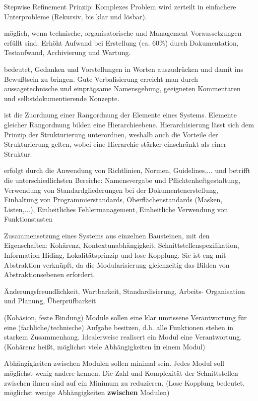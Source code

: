 \documentclass[a4paper,fontsize=9pt, DIV=calc]{scrartcl}
\begin{document}
\begin{multicols}{2}
\begin{description}[leftmargin=*]
		\item[Dekomposition] Stepwise Refinement Prinzip: Komplexes Problem wird zerteilt in einfachere Unterprobleme (Rekursiv, bis klar und lösbar).
		
		\item[Wiederverwendung] möglich, wenn technische, organisatorische und Management Voraussetzungen erfüllt sind. Erhöht Aufwand bei Erstellung (ca. 60\%) durch Dokumentation, Testaufwand, Archivierung und Wartung.
		 \item[Verbalisierung] bedeutet, Gedanken und Vorstellungen in Worten auszudrücken und damit ins Bewußtsein zu bringen. Gute Verbalisierung erreicht man durch aussagetechnische und einprägsame Namensgebung, geeigneten Kommentaren und selbstdokumentierende Konzepte.
		
		\item[Hierarchisierung] ist die Zuordnung einer Rangordnung der Elemente eines Systems. Elemente gleicher Rangordnung bilden eine Hierarchieebene. Hierarchisierung lässt sich dem Prinzip der Strukturierung unterordnen, weshalb auch die Vorteile der Strukturierung gelten, wobei eine Hierarchie stärker einschränkt als einer Struktur.
				
		\item[Standardisierung] erfolgt durch die Anwendung von Richtlinien, Normen, Guidelines,... und betrifft die unterschiedlichsten Bereiche:
				Namensvergabe und Pflichtenheftgestaltung, Verwendung von Standardgliederungen bei der Dokumentenerstellung, Einhaltung von Programmierstandards, Oberflächenstandards (Masken, Listen,...), Einheitliches Fehlermanagement, Einheitliche Verwendung von Funktionstasten

    \item[Modularisierung] Zusammensetzung eines Systems aus einzelnen Bausteinen, mit den Eigenschaften: Kohärenz, Kontextunabhängigkeit, Schnittstellenspezifikation, Information Hiding, Lokalitätsprinzip und lose Kopplung. Sie ist eng mit Abstraktion verknüpft, da die Modularisierung gleichzeitig das Bilden von Abstraktionsebenen erfordert.
		\begin{description}[leftmargin=*]\itemsep-2mm
		\item[Verbesserung/Erleichterung von] Änderungsfreundlichkeit, Wartbarkeit, Standardisierung, Arbeits- Organisation und Planung, Überprüfbarkeit
		\end{description}
				
		\item[Kohärenz] (Kohäsion, feste Bindung) Module sollen eine klar umrissene Verantwortung für eine (fachliche/technische) Aufgabe besitzen, d.h. alle Funktionen stehen in starkem Zusammenhang. Idealerweise realisert ein Modul eine Verantwortung. (Kohärenz heißt, möglichst viele Abhängigkeiten \textbf{in} einem Modul)
		\item[Lose Kopplung] Abhängigkeiten zwischen Modulen sollen minimal sein. Jedes Modul soll möglichst wenig andere kennen. Die Zahl und Komplexität der Schnittstellen zwischen ihnen sind auf ein Minimum zu reduzieren. (Lose Kopplung bedeutet, möglichst wenige Abhängigkeiten \textbf{zwischen} Modulen)


\end{description}
\end{multicols}
\end{document}
